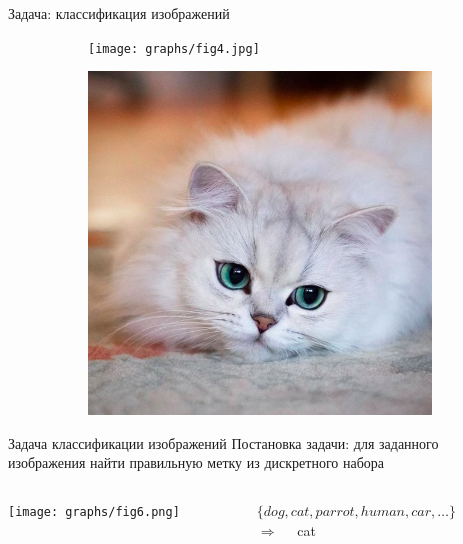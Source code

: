 \documentclass[aspectratio=169]{beamer}
\begin{document}
\begin{frame}{Задача: классификация изображений}
    \begin{figure}
        \begin{subfigure}[b]{\linewidth}
            \centering
            \texttt{[image: graphs/fig4.jpg]}
        \end{subfigure}
        \pause{}
        \begin{subfigure}[b]{\linewidth}
            \centering
            \includegraphics[width=0.38\linewidth]{graphs/fig5.jpg}
        \end{subfigure}
    \end{figure}
\end{frame}

\begin{frame}{Задача классификации изображений}
    Постановка задачи:\pause{}
     для заданного изображения найти правильную метку из дискретного набора
    \vfill
    \begin{columns}
        \begin{column}{0.35\linewidth}
            \texttt{[image: graphs/fig6.png]}
        \end{column}
        \begin{column}{0.65\linewidth}
            \( \{dog, cat, parrot, human, car, \ldots \} \) \\
            \hfill
            \vfill
            \( \Longrightarrow \quad \) cat
        \end{column}
    \end{columns}
\end{frame}
\end{document}
